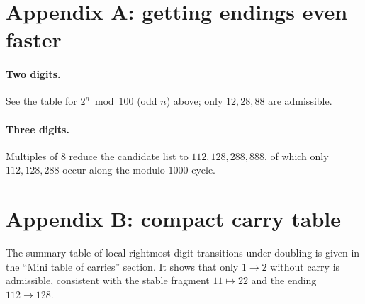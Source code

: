 \documentclass[12pt]{article}
\theoremstyle{plain}
\theoremstyle{remark}
\begin{document}
\section*{Appendix A: getting endings even faster}
\paragraph{Two digits.} See the table for $2^n\bmod100$ (odd $n$) above; only $12,28,88$ are admissible.
\paragraph{Three digits.} Multiples of $8$ reduce the candidate list to $112,128,288,888$, of which only $112,128,288$ occur along the modulo-$1000$ cycle.

\section*{Appendix B: compact carry table}
The summary table of local rightmost-digit transitions under doubling is given in the “Mini table of carries” section. It shows that only $1\to2$ without carry is admissible, consistent with the stable fragment $11\mapsto22$ and the ending $112\to128$.
\end{document}
